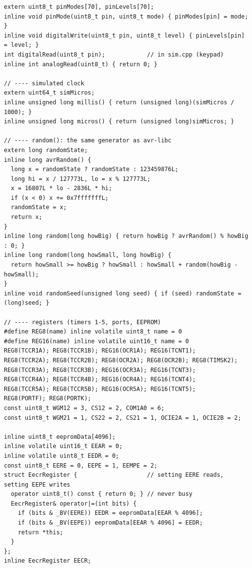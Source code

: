 \documentclass[11pt,a4paper]{article}
\begin{document}
\begin{latin}
\begin{lstlisting}[language=Arduino]
extern uint8_t pinModes[70], pinLevels[70];
inline void pinMode(uint8_t pin, uint8_t mode) { pinModes[pin] = mode; }
inline void digitalWrite(uint8_t pin, uint8_t level) { pinLevels[pin] = level; }
int digitalRead(uint8_t pin);            // in sim.cpp (keypad)
inline int analogRead(uint8_t) { return 0; }

// ---- simulated clock
extern uint64_t simMicros;
inline unsigned long millis() { return (unsigned long)(simMicros / 1000); }
inline unsigned long micros() { return (unsigned long)simMicros; }

// ---- random(): the same generator as avr-libc
extern long randomState;
inline long avrRandom() {
  long x = randomState ? randomState : 123459876L;
  long hi = x / 127773L, lo = x % 127773L;
  x = 16807L * lo - 2836L * hi;
  if (x < 0) x += 0x7fffffffL;
  randomState = x;
  return x;
}
inline long random(long howBig) { return howBig ? avrRandom() % howBig : 0; }
inline long random(long howSmall, long howBig) {
  return howSmall >= howBig ? howSmall : howSmall + random(howBig - howSmall);
}
inline void randomSeed(unsigned long seed) { if (seed) randomState = (long)seed; }

// ---- registers (timers 1-5, ports, EEPROM)
#define REG8(name) inline volatile uint8_t name = 0
#define REG16(name) inline volatile uint16_t name = 0
REG8(TCCR1A); REG8(TCCR1B); REG16(OCR1A); REG16(TCNT1);
REG8(TCCR2A); REG8(TCCR2B); REG8(OCR2A); REG8(OCR2B); REG8(TIMSK2);
REG8(TCCR3A); REG8(TCCR3B); REG16(OCR3A); REG16(TCNT3);
REG8(TCCR4A); REG8(TCCR4B); REG16(OCR4A); REG16(TCNT4);
REG8(TCCR5A); REG8(TCCR5B); REG16(OCR5A); REG16(TCNT5);
REG8(PORTF); REG8(PORTK);
const uint8_t WGM12 = 3, CS12 = 2, COM1A0 = 6;
const uint8_t WGM21 = 1, CS22 = 2, CS21 = 1, OCIE2A = 1, OCIE2B = 2;

inline uint8_t eepromData[4096];
inline volatile uint16_t EEAR = 0;
inline volatile uint8_t EEDR = 0;
const uint8_t EERE = 0, EEPE = 1, EEMPE = 2;
struct EecrRegister {                    // setting EERE reads, setting EEPE writes
  operator uint8_t() const { return 0; } // never busy
  EecrRegister& operator|=(int bits) {
    if (bits & _BV(EERE)) EEDR = eepromData[EEAR % 4096];
    if (bits & _BV(EEPE)) eepromData[EEAR % 4096] = EEDR;
    return *this;
  }
};
inline EecrRegister EECR;


\end{lstlisting}
\end{latin}
\end{document}
